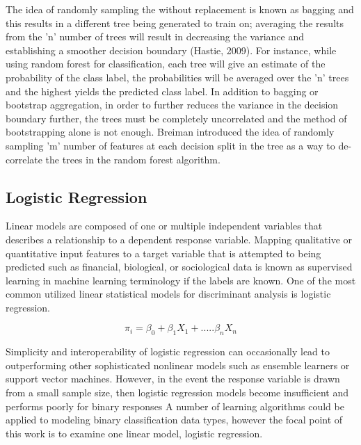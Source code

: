 \documentclass{llncs}
\begin{document}
The idea of randomly sampling the without replacement is known as bagging and this results in a different tree being generated to train on; averaging the results from the 'n' number of trees will result in decreasing the variance and establishing a smoother decision boundary (Hastie, 2009). For instance, while using random forest for classification, each tree will give an estimate of the probability of the class label, the probabilities will be averaged over the 'n' trees and the highest yields the predicted class label. In addition to bagging or bootstrap aggregation, in order to further reduces the variance in the decision boundary further, the trees must be completely uncorrelated and the method of bootstrapping alone is not enough. Breiman introduced the idea of randomly sampling 'm' number of features at each decision split in the tree as a way to de-correlate the trees in the random forest algorithm.  


\subsection{Logistic Regression}

Linear models are composed of one or multiple independent variables that describes a relationship to a dependent response variable. Mapping qualitative or quantitative input features to a target variable that is attempted to being predicted such as financial, biological, or sociological data is known as supervised learning in machine learning terminology if the labels are known.  One of the most common utilized linear statistical models for discriminant analysis is logistic regression.

\begin{equation}
\pi_{i} = \beta_{0} + \beta_{1}X_{1} + .....\beta_{n}X_{n}
\end{equation}

Simplicity and interoperability of logistic regression can occasionally lead to outperforming other sophisticated nonlinear models such as ensemble learners or support vector machines. However, in the event the response variable is drawn from a small sample size, then logistic regression models become insufficient and performs poorly for binary responses A number of learning algorithms could be applied to modeling binary classification data types, however the focal point of this work is to examine one linear model, logistic regression. 
 
\end{document}
